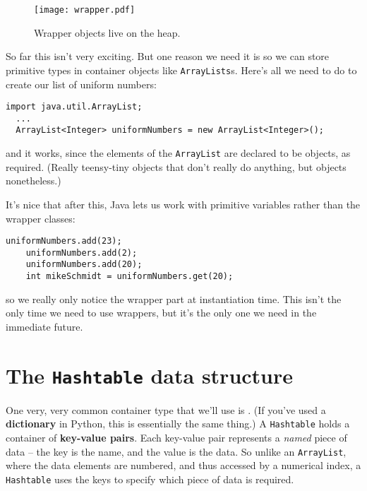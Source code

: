 \begin{figure}[ht]
\centering
\texttt{[image: wrapper.pdf]}  %
\caption{Wrapper objects live on the heap.}
\label{fig:wrapper}
\end{figure}

So far this isn't very exciting. But one reason we need it is so we can store
primitive types in container objects like \texttt{ArrayLists}s. Here's all we
need to do to create our list of uniform numbers:

\begin{Verbatim}[fontsize=\footnotesize,samepage=true]
  import java.util.ArrayList;
  ...
  ArrayList<Integer> uniformNumbers = new ArrayList<Integer>();
\end{Verbatim}

and it works, since the elements of the \texttt{ArrayList} are declared to be
objects, as required. (Really teensy-tiny objects that don't really do
anything, but objects nonetheless.)

It's nice that after this, Java lets us work with primitive variables rather
than the wrapper classes:

\begin{Verbatim}[fontsize=\small,samepage=true]
    uniformNumbers.add(23);
    uniformNumbers.add(2);
    uniformNumbers.add(20);
    int mikeSchmidt = uniformNumbers.get(20);
\end{Verbatim}

so we really only notice the wrapper part at instantiation time. This isn't
the only time we need to use wrappers, but it's the only one we need in the
immediate future.

\section{The \texttt{Hashtable} data structure}
\label{sec:hashtable}

One very, very common container type that we'll use is
. (If you've used a \textbf{dictionary} in Python,
this is essentially the same thing.) A \texttt{Hashtable} holds a container of
\textbf{key-value pairs}. Each key-value pair represents a \textit{named}
piece of data -- the key is the name, and the value is the data. So unlike an
\texttt{ArrayList}, where the data elements are numbered, and thus accessed by
a numerical index, a \texttt{Hashtable} uses the keys to specify which piece
of data is required.

